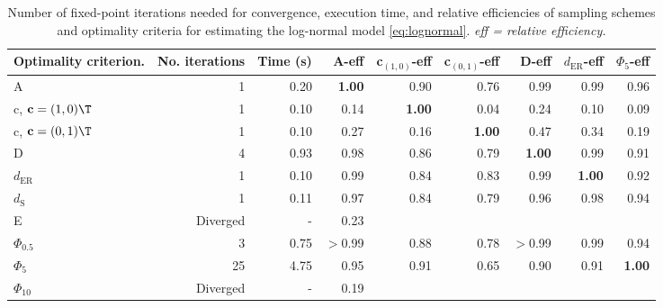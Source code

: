 \begin{table}[htb!]
\centering
\caption{Number of fixed-point iterations needed for convergence, execution time, and relative efficiencies of sampling schemes and optimality criteria for estimating the log-normal model \eqref{eq:lognormal}. \textit{eff = relative efficiency.}} 
\label{tab:baseline_impact_speed}
\begin{tabular}{lrrrrrrrr}
 Optimality criterion. & No. iterations & Time (s) & A-eff & c$_{(1,0)}$-eff & c$_{(0,1)}$-eff & D-eff & $d_{\mathrm{ER}}$-eff & $\Phi_5$-eff \\ 
  \hline
A & 1 & 0.20 & \textbf{1.00} & 0.90 & 0.76 & 0.99 & 0.99 & 0.96 \\ 
  c, $\mathbf{c} = (1,0)\T$ & 1 & 0.10 & 0.14 & \textbf{1.00} & 0.04 & 0.24 & 0.10 & 0.09 \\ 
  c, $\mathbf{c} = (0,1)\T$ & 1 & 0.10 & 0.27 & 0.16 & \textbf{1.00} & 0.47 & 0.34 & 0.19 \\ 
  D & 4 & 0.93 & 0.98 & 0.86 & 0.79 & \textbf{1.00} & 0.99 & 0.91 \\ 
  $d_{\mathrm{ER}}$ & 1 & 0.10 & 0.99 & 0.84 & 0.83 & 0.99 & \textbf{1.00} & 0.92 \\ 
  $d_{\mathrm{S}}$ & 1 & 0.11 & 0.97 & 0.84 & 0.79 & 0.96 & 0.98 & 0.94 \\ 
  E & Diverged & - & 0.23 &  &  &  &  &  \\ 
  $\Phi_{0.5}$ & 3 & 0.75 & $>$0.99 & 0.88 & 0.78 & $>$0.99 & 0.99 & 0.94 \\ 
  $\Phi_5$ & 25 & 4.75 & 0.95 & 0.91 & 0.65 & 0.90 & 0.91 & \textbf{1.00} \\ 
  $\Phi_{10}$ & Diverged & - & 0.19 &  &  &  &  &  \\ 
   \hline
\end{tabular}
\end{table}
